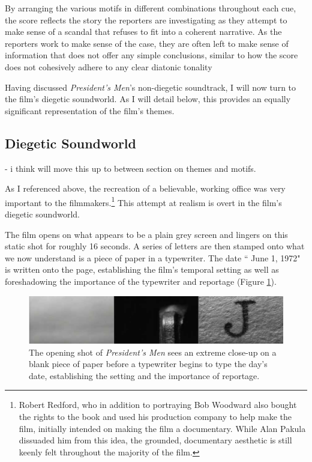 By arranging the various motifs in different combinations throughout each cue, the score reflects the story the reporters are investigating as they attempt to make sense of a scandal that refuses to fit into a coherent  narrative.
As the reporters work to make sense of the case, they are often left to make sense of information that does not offer any simple conclusions, similar to how the score does not cohesively adhere to any clear diatonic tonality

Having discussed \textit{President's Men}'s non-diegetic soundtrack, I will now turn to the film's diegetic soundworld.
As I will detail below, this provides an equally significant representation of the film's themes.



\subsection{Diegetic Soundworld} - i think will move this up to between section on themes and motifs.

As I referenced above, the recreation of a believable, working office was very important to the filmmakers.\footnote{Robert Redford, who in addition to portraying Bob Woodward also bought the rights to the book and used his production company to help make the film, initially intended on making the film a documentary. While Alan Pakula dissuaded him from this idea, the grounded, documentary aesthetic is still keenly felt throughout the majority of the film.}
This attempt at realism is overt in the film's diegetic soundworld.




The film opens on what appears to be a plain grey screen and lingers on this static shot for roughly 16 seconds.
A series of letters are then stamped onto what we now understand is a piece of paper in a typewriter.
The date `` June 1, 1972" is written onto the page, establishing the film's temporal setting as well as foreshadowing the importance of the typewriter and reportage (Figure \ref{fig:president-opening-type}).

\begin{figure}
    \centering
    \includegraphics[width=0.5\linewidth]{img/president-opening-type.pdf}
    \caption{The opening shot of \textit{President's Men} sees an extreme close-up on a blank piece of paper before a typewriter begins to type the day's date, establishing the setting and the importance of reportage.}
    \label{fig:president-opening-type}
\end{figure}


